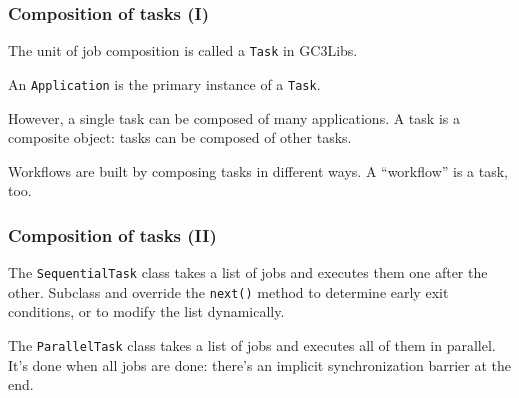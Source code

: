 \documentclass[presentation]{beamer}
\begin{document}
\begin{frame}
\frametitle{Composition of tasks (I)}
\label{sec:11}

  The unit of job composition is called a \texttt{Task} in GC3Libs.

  An \texttt{Application} is the primary instance of a \texttt{Task}.

  However, a single task can be composed of many applications.
  A task is a composite object: tasks can be composed of other tasks.

  Workflows are built by composing tasks in different ways.
  A ``workflow'' is a task, too.
\end{frame}
\begin{frame}
\frametitle{Composition of tasks (II)}
\label{sec:12}

  The \texttt{SequentialTask} class takes a list of jobs and executes them
  one after the other. Subclass and override the \texttt{next()} method to
  determine early exit conditions, or to modify the list dynamically.

  The \texttt{ParallelTask} class takes a list of jobs and executes all of
  them in parallel.  It's done when all jobs are done: there's an
  implicit synchronization barrier at the end.
  
\end{frame}
\end{document}
